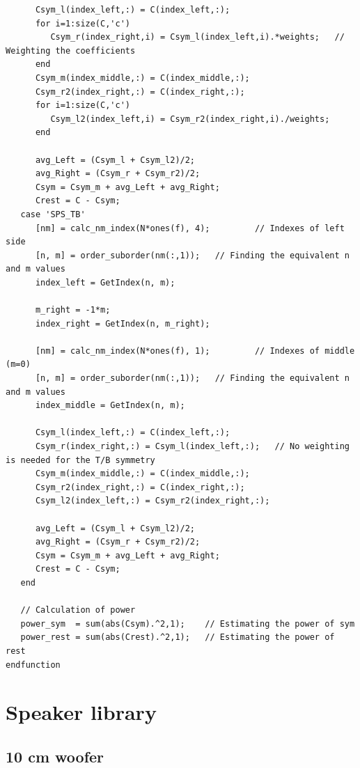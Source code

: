 \documentclass{report}
\begin{document}
\begin{appendices}
\begin{lstlisting}
      Csym_l(index_left,:) = C(index_left,:);      
      for i=1:size(C,'c')
         Csym_r(index_right,i) = Csym_l(index_left,i).*weights;   // Weighting the coefficients
      end
      Csym_m(index_middle,:) = C(index_middle,:);      
      Csym_r2(index_right,:) = C(index_right,:);
      for i=1:size(C,'c')
         Csym_l2(index_left,i) = Csym_r2(index_right,i)./weights;
      end 
      
      avg_Left = (Csym_l + Csym_l2)/2;
      avg_Right = (Csym_r + Csym_r2)/2;
      Csym = Csym_m + avg_Left + avg_Right;
      Crest = C - Csym;
   case 'SPS_TB'
      [nm] = calc_nm_index(N*ones(f), 4);         // Indexes of left side
      [n, m] = order_suborder(nm(:,1));   // Finding the equivalent n and m values
      index_left = GetIndex(n, m);
      
      m_right = -1*m;
      index_right = GetIndex(n, m_right);
      
      [nm] = calc_nm_index(N*ones(f), 1);         // Indexes of middle (m=0)
      [n, m] = order_suborder(nm(:,1));   // Finding the equivalent n and m values
      index_middle = GetIndex(n, m);
      
      Csym_l(index_left,:) = C(index_left,:);
      Csym_r(index_right,:) = Csym_l(index_left,:);   // No weighting is needed for the T/B symmetry
      Csym_m(index_middle,:) = C(index_middle,:);      
      Csym_r2(index_right,:) = C(index_right,:);
      Csym_l2(index_left,:) = Csym_r2(index_right,:);
      
      avg_Left = (Csym_l + Csym_l2)/2;
      avg_Right = (Csym_r + Csym_r2)/2;      
      Csym = Csym_m + avg_Left + avg_Right;
      Crest = C - Csym;
   end
   
   // Calculation of power
   power_sym  = sum(abs(Csym).^2,1);    // Estimating the power of sym
   power_rest = sum(abs(Crest).^2,1);   // Estimating the power of rest
endfunction
\end{lstlisting}

\chapter{Speaker library}
\label{chap:spk_lib}

\section{10 cm woofer}
\label{spkrlib:10cm}


\end{appendices}
\end{document}
